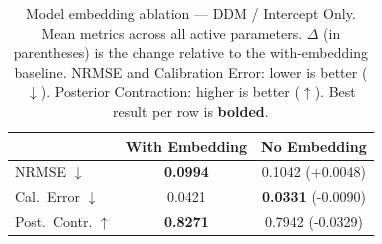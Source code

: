 \begin{table}[t]
\centering
\caption{Model embedding ablation — DDM / Intercept Only. Mean metrics across
all active parameters. $\Delta$ (in parentheses) is the change relative to the
with-embedding baseline. NRMSE and Calibration Error: lower is better ($\downarrow$).
Posterior Contraction: higher is better ($\uparrow$). Best result per row is
\textbf{bolded}.}
\label{tab:embed_ablation_ddm_intercept_only}
\begin{tabular}{lcc}
\toprule
 & With Embedding & No Embedding \\
\midrule
NRMSE $\downarrow$ & \textbf{0.0994} & 0.1042 \small{(+0.0048)} \\
Cal.\ Error $\downarrow$ & 0.0421 & \textbf{0.0331} \small{(-0.0090)} \\
Post.\ Contr. $\uparrow$ & \textbf{0.8271} & 0.7942 \small{(-0.0329)} \\
\bottomrule
\end{tabular}
\end{table}